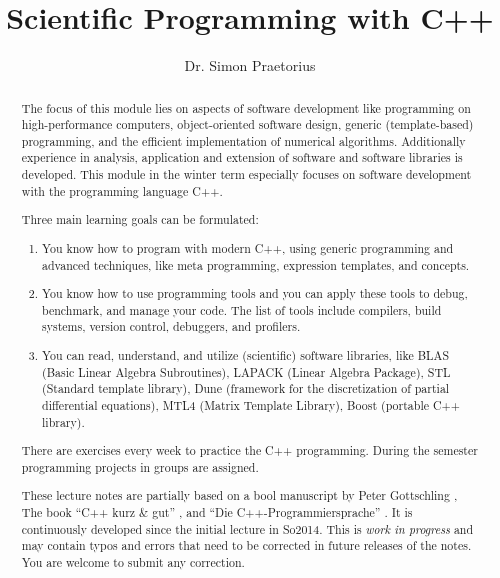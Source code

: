 \documentclass[10pt,a4paper]{report}
\author{Dr. Simon Praetorius}
\title{Scientific Programming with C++}
\begin{document}
\maketitle
\begin{abstract}
The focus of this module lies on aspects of software development like programming on high-performance computers,
object-oriented software design, generic (template-based) programming, and the efficient implementation of
numerical algorithms. Additionally experience in analysis, application and extension of software and software
libraries is developed. This module in the winter term especially focuses on software development with the
programming language C++.

Three main learning goals can be formulated:
\begin{enumerate}
  \item You know how to program with modern C++, using generic programming and advanced techniques, like meta
  programming, expression templates, and concepts.
  \item You know how to use programming tools and you can apply these tools to debug, benchmark, and manage your
  code. The list of tools include compilers, build systems, version control, debuggers, and profilers.
  \item You can read, understand, and utilize (scientific) software libraries, like BLAS (Basic Linear Algebra
  Subroutines), LAPACK (Linear Algebra Package), STL (Standard template library), Dune (framework for the
  discretization of partial differential equations), MTL4 (Matrix Template Library), Boost (portable C++ library).
\end{enumerate}

There are exercises every week to practice the C++ programming. During the semester programming projects in groups
are assigned.

These lecture notes are partially based on a bool manuscript by Peter Gottschling \cite{gottschling2016}, The book
``C++ kurz \& gut'' \cite{loudon2013}, and ``Die C++-Programmiersprache'' \cite{stroustrup2000}. It is continuously
developed since the initial lecture in So2014. This is \textit{work in progress} and may contain typos and errors
that need to be corrected in future releases of the notes. You are welcome to submit any correction.
\end{abstract}

\tableofcontents


%
%
%
%
%
%
%
%
%
%
%
%
%

\todos

\printindex



\end{document}

